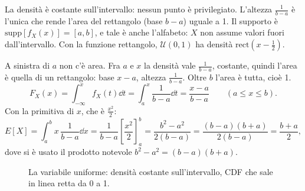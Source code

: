 La densità è costante sull'intervallo: nessun punto è privilegiato. L'altezza $\frac{1}{b-a}$ è l'unica che rende
l'area del rettangolo (base $b - a$) uguale a 1. Il supporto è $\mathrm{supp}[f_X(x)] = [a, b]$, e tale è anche
l'alfabeto: $X$ non assume valori fuori dall'intervallo. Con la funzione rettangolo,
$\mathcal{U}(0, 1)$ ha densità $\mathrm{rect}\left(x - \frac12\right)$.


\begin{dimostrazione}
 A sinistra di $a$ non c'è area. Fra $a$ e $x$ la densità vale $\frac{1}{b-a}$, costante, quindi l'area
è quella di un rettangolo: base $x - a$, altezza $\frac{1}{b-a}$. Oltre $b$ l'area è tutta, cioè 1.
\[ F_X(x) = \int_{-\infty}^{x} f_X(t) \dd t = \int_a^x \frac{1}{b - a} \dd t = \frac{x - a}{b - a} \qquad (a \leq x \leq b) . \]
 Con la primitiva di $x$, che è $\frac{x^2}{2}$:
\[ E[X] = \int_a^b x\, \frac{1}{b - a} \dd x = \frac{1}{b - a} \left[ \frac{x^2}{2} \right]_a^b = \frac{b^2 - a^2}{2(b
   - a)} = \frac{(b - a)(b + a)}{2(b - a)} = \frac{b + a}{2} , \]
dove si è usato il prodotto notevole $b^2 - a^2 = (b - a)(b + a)$.
\end{dimostrazione}

\begin{figure}[H]
\centering
{}
\caption{La variabile uniforme: densità costante sull'intervallo, CDF che sale in linea retta da 0 a 1.}
\end{figure}

